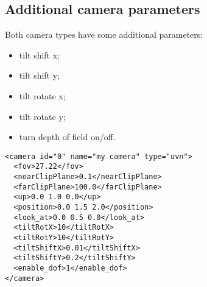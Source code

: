 \documentclass[a4paper,11pt]{report}
\begin{document}
\subsection{Additional camera parameters}

Both camera types have some additional parameters:
\begin{itemize}
\item tilt shift x;
\item tilt shift y;
\item tilt rotate x;
\item tilt rotate y;
\item turn depth of field on/off.
\end{itemize}

\lstset{language=XML}
\begin{lstlisting}
<camera id="0" name="my camera" type="uvn">
  <fov>27.22</fov>
  <nearClipPlane>0.1</nearClipPlane>
  <farClipPlane>100.0</farClipPlane>
  <up>0.0 1.0 0.0</up>
  <position>0.0 1.5 2.0</position>
  <look_at>0.0 0.5 0.0</look_at>
  <tiltRotX>10</tiltRotX>
  <tiltRotY>10</tiltRotY>
  <tiltShiftX>0.01</tiltShiftX>
  <tiltShiftY>0.2</tiltShiftY>
  <enable_dof>1</enable_dof>
</camera>
\end{lstlisting}
\end{document}
